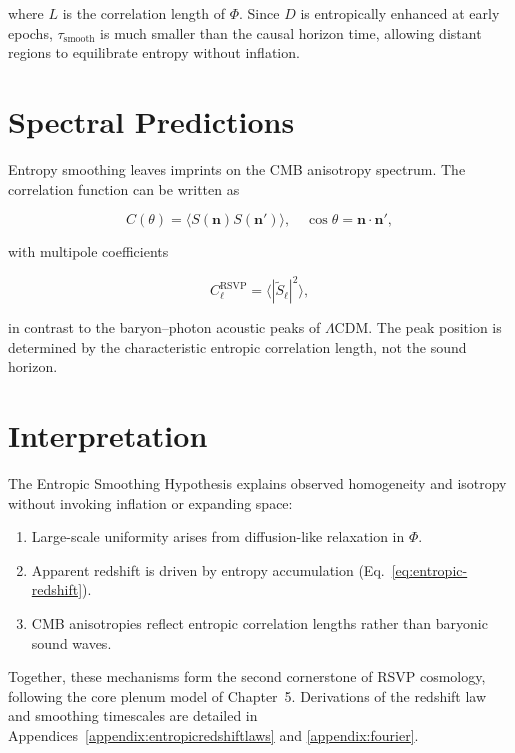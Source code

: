 \documentclass[12pt]{report}
\begin{document}
where $L$ is the correlation length of $\Phi$.  
Since $D$ is entropically enhanced at early epochs, $\tau_{\text{smooth}}$ is much smaller than the causal horizon time, allowing distant regions to equilibrate entropy without inflation.

\section{Spectral Predictions}

Entropy smoothing leaves imprints on the CMB anisotropy spectrum. The correlation function can be written as

\begin{equation}
C(\theta) = \langle S(\mathbf{n}) S(\mathbf{n}') \rangle, 
\quad \cos \theta = \mathbf{n}\cdot \mathbf{n}',
\end{equation}

with multipole coefficients

\begin{equation}
C_\ell^{\text{RSVP}} = \langle |\tilde{S}_\ell|^2 \rangle,
\label{eq:spectrum}
\end{equation}

in contrast to the baryon–photon acoustic peaks of $\Lambda$CDM. The peak position is determined by the characteristic entropic correlation length, not the sound horizon.

\section{Interpretation}

The Entropic Smoothing Hypothesis explains observed homogeneity and isotropy without invoking inflation or expanding space:

\begin{enumerate}
    \item Large-scale uniformity arises from diffusion-like relaxation in $\Phi$.
    \item Apparent redshift is driven by entropy accumulation (Eq.~\ref{eq:entropic-redshift}).
    \item CMB anisotropies reflect entropic correlation lengths rather than baryonic sound waves.
\end{enumerate}

Together, these mechanisms form the second cornerstone of RSVP cosmology, following the core plenum model of Chapter~5. Derivations of the redshift law and smoothing timescales are detailed in Appendices~\ref{appendix:entropicredshiftlaws} and \ref{appendix:fourier}.
\end{document}
